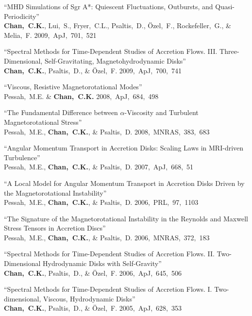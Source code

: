 \begin{ilist}
\item ``MHD Simulations of Sgr A*: Quiescent Fluctuations, Outbursts, and Quasi-Periodicity''\\
  \textbf{Chan,~C.K.}, Lui,~S., Fryer,~C.L., Psaltis,~D., \"Ozel,~F., Rockefeller,~G., \& Melia,~F.
  2009,~ApJ,~701,~521

\item ``Spectral Methods for Time-Dependent Studies of Accretion Flows.
  III. Three-Dimensional, Self-Gravitating, Magnetohydrodynamic Disks''\\
  \textbf{Chan,~C.K.}, Psaltis,~D., \& \"Ozel,~F.
  2009,~ApJ,~700,~741

\item ``Viscous, Resistive Magnetorotational Modes''\\
  Pessah,~M.E. \& \textbf{Chan,~C.K.}
  2008,~ApJ,~684,~498

\item ``The Fundamental Difference between $\alpha$-Viscosity and Turbulent Magnetorotational Stress''\\
  Pessah,~M.E., \textbf{Chan,~C.K.}, \& Psaltis,~D.
  2008,~MNRAS,~383,~683

\item ``Angular Momentum Transport in Accretion Disks: Scaling Laws in MRI-driven Turbulence''\\
  Pessah,~M.E., \textbf{Chan,~C.K.}, \& Psaltis,~D.
  2007,~ApJ,~668,~51

\item ``A Local Model for Angular Momentum Transport in Accretion Disks Driven by the Magnetorotational Instability''\\
  Pessah,~M.E., \textbf{Chan,~C.K.}, \& Psaltis,~D.
  2006,~PRL,~97,~1103

\item ``The Signature of the Magnetorotational Instability in the Reynolds and Maxwell Stress Tensors in Accretion Discs''\\
  Pessah,~M.E., \textbf{Chan,~C.K.}, \& Psaltis,~D.
  2006,~MNRAS,~372,~183

\item ``Spectral Methods for Time-Dependent Studies of Accretion Flows.
  II. Two-Dimensional Hydrodynamic Disks with Self-Gravity''\\
  \textbf{Chan,~C.K.}, Psaltis,~D., \& \"Ozel,~F.
  2006,~ApJ,~645,~506

\item ``Spectral Methods for Time-Dependent Studies of Accretion Flows.
  I. Two-dimensional, Viscous, Hydrodynamic Disks''\\
  \textbf{Chan,~C.K.}, Psaltis,~D., \& \"Ozel,~F.
  2005,~ApJ,~628,~353

\end{ilist}
